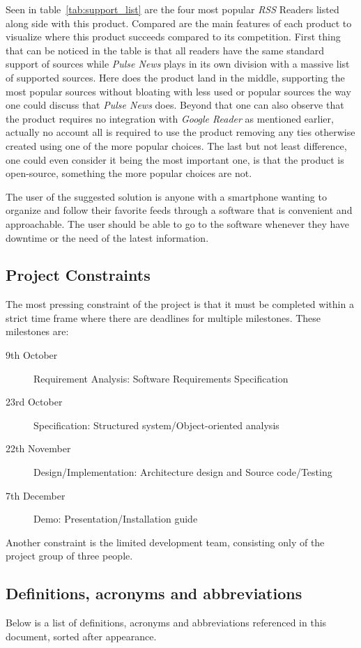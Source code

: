 Seen in table~\ref{tab:support_list} are the four most popular \textit{RSS} Readers listed along side with this product. Compared are the main features of each product to visualize where this product succeeds compared to its competition. First thing that can be noticed in the table is that all readers have the same standard support of sources while \textit{Pulse News} plays in its own division with a massive list of supported sources. Here does the product land in the middle, supporting the most popular sources without bloating with less used or popular sources the way one could discuss that \textit{Pulse News} does. Beyond that one can also observe that the product requires no integration with \textit{Google Reader} as mentioned earlier, actually no account all is required to use the product removing any ties otherwise created using one of the more popular choices. The last but not least difference, one could even consider it being the most important one, is that the product is open-source, something the more popular choices are not.

The user of the suggested solution is anyone with a smartphone wanting to organize and follow their favorite feeds through a software that is convenient and approachable. The user should be able to go to the software whenever they have downtime or the need of the latest information.


\subsection{Project Constraints}
The most pressing constraint of the project is that it must be completed within a strict time frame where there are deadlines for multiple milestones. These milestones are:
\begin{description}
  \item[9th October] Requirement Analysis: Software Requirements Specification
  \item[23rd October] Specification: Structured system/Object-oriented analysis
  \item[22th November] Design/Implementation: Architecture design and Source code/Testing
  \item[7th December] Demo: Presentation/Installation guide
\end{description}
Another constraint is the limited development team, consisting only of the project group of three people. 


\subsection{Definitions, acronyms and abbreviations}
Below is a list of definitions, acronyms and abbreviations referenced in this document, sorted after appearance.

